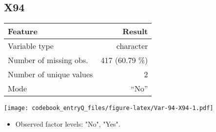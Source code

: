 \documentclass[]{article}
\providecommand{\tightlist}{%
  \setlength{\itemsep}{0pt}\setlength{\parskip}{0pt}}
\newcommand{\fullline}{\noindent\makebox[\linewidth]{\rule{\textwidth}{0.4pt}}}
\newcommand{\bminione}{\begin{minipage}{0.75 \textwidth}}
\newcommand{\bminitwo}{\begin{minipage}{0.25 \textwidth}}
\newcommand{\emini}{\end{minipage}}
\begin{document}
\fullline

\hypertarget{x94}{\subsection{X94}\label{x94}}

\bminione

\begin{longtable}[]{@{}lr@{}}
\toprule
\begin{minipage}[b]{0.34\columnwidth}\raggedright\strut
Feature\strut
\end{minipage} & \begin{minipage}[b]{0.20\columnwidth}\raggedleft\strut
Result\strut
\end{minipage}\tabularnewline
\midrule
\endhead
\begin{minipage}[t]{0.34\columnwidth}\raggedright\strut
Variable type\strut
\end{minipage} & \begin{minipage}[t]{0.20\columnwidth}\raggedleft\strut
character\strut
\end{minipage}\tabularnewline
\begin{minipage}[t]{0.34\columnwidth}\raggedright\strut
Number of missing obs.\strut
\end{minipage} & \begin{minipage}[t]{0.20\columnwidth}\raggedleft\strut
417 (60.79 \%)\strut
\end{minipage}\tabularnewline
\begin{minipage}[t]{0.34\columnwidth}\raggedright\strut
Number of unique values\strut
\end{minipage} & \begin{minipage}[t]{0.20\columnwidth}\raggedleft\strut
2\strut
\end{minipage}\tabularnewline
\begin{minipage}[t]{0.34\columnwidth}\raggedright\strut
Mode\strut
\end{minipage} & \begin{minipage}[t]{0.20\columnwidth}\raggedleft\strut
``No''\strut
\end{minipage}\tabularnewline
\bottomrule
\end{longtable}

\emini
\bminitwo
\texttt{[image: codebook\_entryQ\_files/figure-latex/Var-94-X94-1.pdf]}
\emini

\begin{itemize}
\tightlist
\item
  Observed factor levels: "No", "Yes".
\end{itemize}
\end{document}

